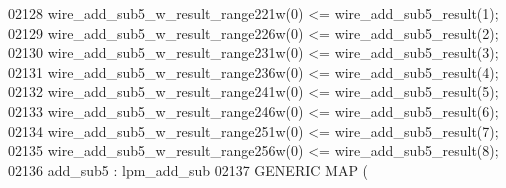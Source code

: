 \begin{DoxyCode}
{02128     \textcolor{vhdlchar}{wire_add_sub5_w_result_range221w}\textcolor{vhdlchar}{(}\textcolor{vhdllogic}{}\textcolor{vhdllogic}{0}\textcolor{vhdlchar}{)} \textcolor{vhdlchar}{<=} \textcolor{vhdlchar}{wire_add_sub5_result}\textcolor{vhdlchar}{(}\textcolor{vhdllogic}{}\textcolor{vhdllogic}{1}\textcolor{vhdlchar}{)};
02129     \textcolor{vhdlchar}{wire_add_sub5_w_result_range226w}\textcolor{vhdlchar}{(}\textcolor{vhdllogic}{}\textcolor{vhdllogic}{0}\textcolor{vhdlchar}{)} \textcolor{vhdlchar}{<=} \textcolor{vhdlchar}{wire_add_sub5_result}\textcolor{vhdlchar}{(}\textcolor{vhdllogic}{}\textcolor{vhdllogic}{2}\textcolor{vhdlchar}{)};
02130     \textcolor{vhdlchar}{wire_add_sub5_w_result_range231w}\textcolor{vhdlchar}{(}\textcolor{vhdllogic}{}\textcolor{vhdllogic}{0}\textcolor{vhdlchar}{)} \textcolor{vhdlchar}{<=} \textcolor{vhdlchar}{wire_add_sub5_result}\textcolor{vhdlchar}{(}\textcolor{vhdllogic}{}\textcolor{vhdllogic}{3}\textcolor{vhdlchar}{)};
02131     \textcolor{vhdlchar}{wire_add_sub5_w_result_range236w}\textcolor{vhdlchar}{(}\textcolor{vhdllogic}{}\textcolor{vhdllogic}{0}\textcolor{vhdlchar}{)} \textcolor{vhdlchar}{<=} \textcolor{vhdlchar}{wire_add_sub5_result}\textcolor{vhdlchar}{(}\textcolor{vhdllogic}{}\textcolor{vhdllogic}{4}\textcolor{vhdlchar}{)};
02132     \textcolor{vhdlchar}{wire_add_sub5_w_result_range241w}\textcolor{vhdlchar}{(}\textcolor{vhdllogic}{}\textcolor{vhdllogic}{0}\textcolor{vhdlchar}{)} \textcolor{vhdlchar}{<=} \textcolor{vhdlchar}{wire_add_sub5_result}\textcolor{vhdlchar}{(}\textcolor{vhdllogic}{}\textcolor{vhdllogic}{5}\textcolor{vhdlchar}{)};
02133     \textcolor{vhdlchar}{wire_add_sub5_w_result_range246w}\textcolor{vhdlchar}{(}\textcolor{vhdllogic}{}\textcolor{vhdllogic}{0}\textcolor{vhdlchar}{)} \textcolor{vhdlchar}{<=} \textcolor{vhdlchar}{wire_add_sub5_result}\textcolor{vhdlchar}{(}\textcolor{vhdllogic}{}\textcolor{vhdllogic}{6}\textcolor{vhdlchar}{)};
02134     \textcolor{vhdlchar}{wire_add_sub5_w_result_range251w}\textcolor{vhdlchar}{(}\textcolor{vhdllogic}{}\textcolor{vhdllogic}{0}\textcolor{vhdlchar}{)} \textcolor{vhdlchar}{<=} \textcolor{vhdlchar}{wire_add_sub5_result}\textcolor{vhdlchar}{(}\textcolor{vhdllogic}{}\textcolor{vhdllogic}{7}\textcolor{vhdlchar}{)};
02135     \textcolor{vhdlchar}{wire_add_sub5_w_result_range256w}\textcolor{vhdlchar}{(}\textcolor{vhdllogic}{}\textcolor{vhdllogic}{0}\textcolor{vhdlchar}{)} \textcolor{vhdlchar}{<=} \textcolor{vhdlchar}{wire_add_sub5_result}\textcolor{vhdlchar}{(}\textcolor{vhdllogic}{}\textcolor{vhdllogic}{8}\textcolor{vhdlchar}{)};
02136     add_sub5 :  lpm\_add\_sub
02137       \textcolor{keywordflow}{GENERIC} \textcolor{keywordflow}{MAP} (
}
\end{DoxyCode}
